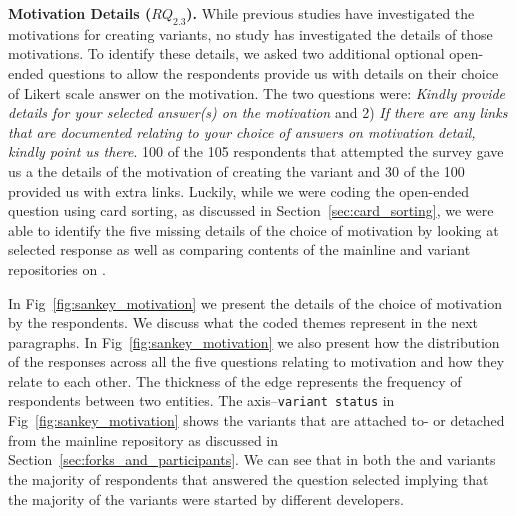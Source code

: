 
\nd \textbf{Motivation Details ($RQ_{2.3}$).} While previous studies have investigated the motivations for creating variants, no study has investigated the details of those motivations. To identify these details, we asked two additional optional open-ended questions to allow the respondents provide us with details on their choice of Likert scale answer on the motivation. The two questions were: \emph{Kindly provide details for your selected answer(s) on the motivation} and 2) \emph{If there are any links that are documented relating to your choice of answers on motivation detail, kindly point us there}. 100 of the 105 respondents that attempted the survey gave us a the details of the motivation of creating the variant and 30 of the 100 provided us with extra links. Luckily, while we were coding the open-ended question using card sorting, as discussed in Section~\ref{sec:card_sorting}, we were able to identify the five missing details of the choice of motivation by looking at selected response as well as comparing contents of the mainline and variant repositories on \gh.

In Fig~\ref{fig:sankey_motivation} we present the details of the choice of motivation by the respondents. We discuss what the coded themes represent in the next paragraphs. 
In Fig~\ref{fig:sankey_motivation} we also present how the distribution of the responses across all the five questions relating to motivation and how they relate to each other. The thickness of the edge represents the frequency of respondents between two entities.
The axis--\texttt{variant status} in Fig~\ref{fig:sankey_motivation} shows the variants that are attached to- or detached from the mainline repository as discussed in Section~\ref{sec:forks_and_participants}. We can see that in both the  and  variants the majority of respondents that answered the question  selected  implying that the majority of the variants were started by different developers.


